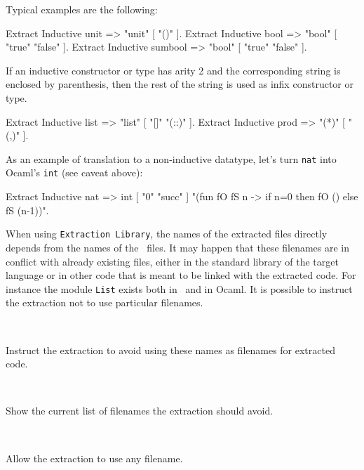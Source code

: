 \Example
Typical examples are the following:
\begin{coq_example}
Extract Inductive unit => "unit" [ "()" ].
Extract Inductive bool => "bool" [ "true" "false" ].
Extract Inductive sumbool => "bool" [ "true" "false" ].
\end{coq_example}

If an inductive constructor or type has arity 2 and the corresponding 
string is enclosed by parenthesis, then the rest of the string is used
as infix constructor or type. 
\begin{coq_example}
Extract Inductive list => "list" [ "[]" "(::)" ].
Extract Inductive prod => "(*)"  [ "(,)" ].
\end{coq_example}

As an example of translation to a non-inductive datatype, let's turn
{\tt nat} into Ocaml's {\tt int} (see caveat above):
\begin{coq_example}
Extract Inductive nat => int [ "0" "succ" ]
 "(fun fO fS n -> if n=0 then fO () else fS (n-1))".
\end{coq_example}



When using {\tt Extraction Library}, the names of the extracted files
directly depends from the names of the \Coq\ files. It may happen that
these filenames are in conflict with already existing files, 
either in the standard library of the target language or in other
code that is meant to be linked with the extracted code. 
For instance the module {\tt List} exists both in \Coq\ and in Ocaml.
It is possible to instruct the extraction not to use particular filenames.

\begin{description}
\item{} ~\par
  Instruct the extraction to avoid using these names as filenames
  for extracted code. 
\item{} ~\par
  Show the current list of filenames the extraction should avoid.
\item{} ~\par
  Allow the extraction to use any filename.
\end{description}

